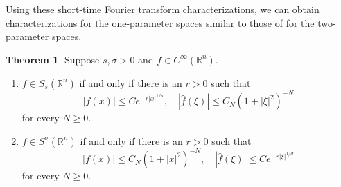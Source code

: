 \documentclass[11pt,a4paper,reqno]{amsart}
\numberwithin{equation}{section}
\theoremstyle{definition}
\newtheorem{thm}{Theorem}[section]
\theoremstyle{definition}
\begin{document}
Using these short-time Fourier transform characterizations, we can obtain characterizations for the one-parameter spaces similar to those of \cite{chung} for the two-parameter spaces.
\begin{thm}\label{thm:SsFT}
Suppose $s,\sigma>0$ and $f\in C^\infty(\mathbb{R}^n)$.
\begin{enumerate}[label=(\alph*)]

    \item $f\in S_s(\mathbb{R}^n)$ if and only if there is an $r>0$ such that
    \begin{equation}\label{eq:Ssaltchar}
        |f(x)|\leq C e^{-r|x|^{1/s}}, \quad |\hat{f}(\xi)|\leq C_N (1+|\xi|^2)^{-N} 
    \end{equation}
    for every $N\geq 0$.
    \item $f\in S^\sigma(\mathbb{R}^n)$ if and only if there is an $r>0$ such that
    \begin{equation}\label{eq:Ssigaltchar}
        |f(x)|\leq C_N (1+|x|^2)^{-N} , \quad |\hat{f}(\xi)|\leq C e^{-r|\xi|^{1/\sigma}}
    \end{equation}
    for every $N\geq 0$.
\end{enumerate}
\end{thm}
\end{document}
